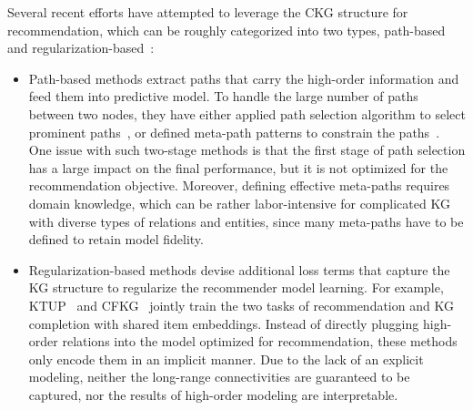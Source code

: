 \documentclass[sigconf]{acmart}
\theoremstyle{definition}
\begin{document}
Several recent efforts have attempted to leverage the CKG structure for recommendation, which can be roughly categorized into two types, path-based~\cite{DBLP:conf/wsdm/YuRSGSKNH14,MetaFMG,MCRec,KGreasoning19,KGRnn18,RippleNet} and regularization-based~\cite{CKE,KGreasoning19,KGMemory18,KTUP}: 
\begin{itemize}[leftmargin=*]
    \item Path-based methods extract paths that carry the high-order information and feed them into predictive model. To handle the large number of paths between two nodes, they have either applied path selection algorithm 
to select prominent paths~\cite{KGRnn18,KGreasoning19}, 
or defined meta-path patterns to constrain the paths~\cite{yu2013collaborative,MCRec}. One issue with such two-stage methods is that the first stage of path selection has a large impact on the final performance, but it is not optimized for the recommendation objective. Moreover, defining effective meta-paths requires domain knowledge, which can be rather labor-intensive for complicated KG with diverse types of relations and entities, since many meta-paths have to be defined to retain model fidelity.
    \item Regularization-based methods devise additional loss terms that capture the KG structure to regularize the recommender model learning. 
For example, KTUP~\cite{KTUP} and CFKG~\cite{CFKG} jointly train the two tasks of recommendation and KG completion with shared item embeddings. 
    Instead of directly plugging high-order relations into the model optimized for recommendation, these methods only encode them in an implicit manner. Due to the lack of an explicit modeling, neither the long-range connectivities are guaranteed to be captured, nor the results of high-order modeling are interpretable. 
\end{itemize}
\end{document}
